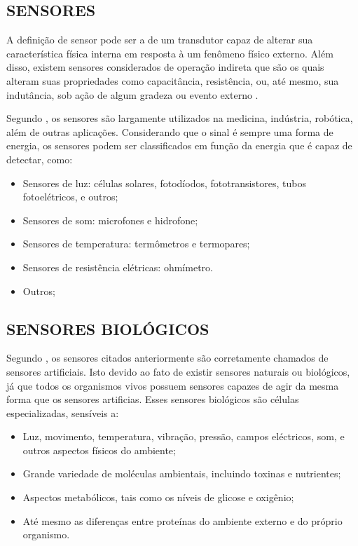 \subsection{SENSORES}
A definição de sensor pode ser a de um transdutor capaz de alterar sua característica física interna em resposta à um fenômeno físico externo. Além disso, existem sensores considerados de operação indireta que são os quais alteram suas propriedades como capacitância, resistência, ou, até mesmo, sua indutância, sob ação de algum gradeza ou evento externo \cite{rosario2006principios}. 

Segundo \cite{nomadusp2014}, os sensores são largamente utilizados na medicina, indústria, robótica, além de outras aplicações. Considerando que o sinal é sempre uma forma de energia, os sensores podem ser classificados em função da energia que é capaz de detectar, como:

\begin{itemize}
\item Sensores de luz: células solares, fotodíodos, fototransistores, tubos fotoelétricos, e outros;
\item Sensores de som: microfones e hidrofone;
\item Sensores de temperatura: termômetros e termopares;
\item Sensores de resistência elétricas: ohmímetro. 
\item Outros;
\end{itemize}

\subsection{SENSORES BIOLÓGICOS}
Segundo \cite{nomadusp2014}, os sensores citados anteriormente são corretamente chamados de sensores artificiais. Isto devido ao fato de existir sensores naturais ou biológicos, já que todos os organismos vivos possuem sensores capazes de agir da mesma forma que os sensores artificias. Esses sensores biológicos são células especializadas, sensíveis a:

\begin{itemize}
\item Luz, movimento, temperatura, vibração, pressão, campos eléctricos, som, e outros aspectos físicos do ambiente;
\item Grande variedade de moléculas ambientais, incluindo toxinas e nutrientes;
\item Aspectos metabólicos, tais como os níveis de glicose e oxigênio;
\item Até mesmo as diferenças entre proteínas do ambiente externo e do próprio organismo.
\end{itemize}


